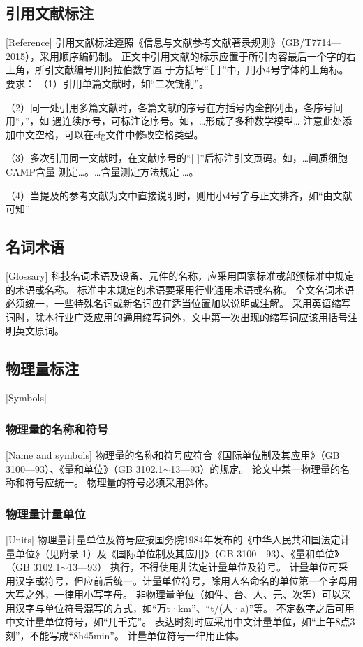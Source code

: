 \subsection{引用文献标注}[Reference]
引用文献标注遵照《信息与文献参考文献著录规则》（GB/T7714—2015），采用顺序编码制。
正文中引用文献的标示应置于所引内容最后一个字的右上角，所引文献编号用阿拉伯数字置
于方括号“［ ］”中，用小4号字体的上角标。
要求：
（1）引用单篇文献时，如“二次铣削\cite{cnproceed}”。

（2）同一处引用多篇文献时，各篇文献的序号在方括号内全部列出，各序号间用“，”，如
遇连续序号，可标注讫序号。如，…形成了多种数学模型\cite{cnarticle,cnproceed}…
注意此处添加中文空格，可以在cfg文件中修改空格类型。

（3）多次引用同一文献时，在文献序号的“[ ]”后标注引文页码。如，…间质细胞CAMP含量
测定\cite[100-197]{cnarticle}…。…含量测定方法规定
\cite[92]{cnarticle}…。

（4）当提及的参考文献为文中直接说明时，则用小4号字与正文排齐，如“由文献可知”

\subsection{名词术语}[Glossary]
科技名词术语及设备、元件的名称，应采用国家标准或部颁标准中规定的术语或名称。
标准中未规定的术语要采用行业通用术语或名称。
全文名词术语必须统一，一些特殊名词或新名词应在适当位置加以说明或注解。
采用英语缩写词时，除本行业广泛应用的通用缩写词外，文中第一次出现的缩写词应该用括号注明英文原词。

\subsection{物理量标注}[Symbols]
\subsubsection{物理量的名称和符号}[Name and symbols]
物理量的名称和符号应符合《国际单位制及其应用》（GB 3100—93）、《量和单位》（GB
3102.1$\sim$13—93）的规定。
论文中某一物理量的名称和符号应统一。
物理量的符号必须采用斜体。

\subsubsection{物理量计量单位}[Units]
物理量计量单位及符号应按国务院1984年发布的《中华人民共和国法定计量单位》（见附录
1）及《国际单位制及其应用》（GB 3100—93）、《量和单位》（GB 3102.1$\sim$13—93）
执行，不得使用非法定计量单位及符号。
计量单位可采用汉字或符号，但应前后统一。计量单位符号，除用人名命名的单位第一个字母用大写之外，一律用小写字母。
非物理量单位（如件、台、人、元、次等）可以采用汉字与单位符号混写的方式，如“万t·km”、“t/(人·a)”等。
不定数字之后可用中文计量单位符号，如“几千克”。
表达时刻时应采用中文计量单位，如“上午8点3刻”，不能写成“8h45min”。
计量单位符号一律用正体。

